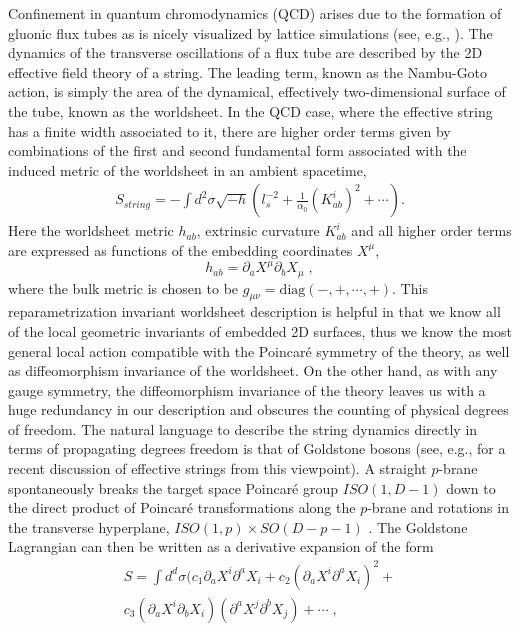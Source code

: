 \documentclass[%
 reprint,
 amsmath,amssymb,
 aps,
]{revtex4-1}
\begin{document}
Confinement in quantum chromodynamics (QCD) arises due to the formation of
gluonic flux tubes as is nicely visualized by lattice simulations (see, e.g., \cite{Bissey:2006bz}).
The dynamics of the transverse oscillations of a flux tube are
described by the 2D effective field theory of a string. The leading term, known as the
Nambu-Goto action, is simply the area of the dynamical, effectively two-dimensional surface
of the tube, known as the worldsheet. In the QCD case, where the effective string has a finite
width associated to it, there are higher order terms given by combinations of the first
and second fundamental form associated with the induced metric of the worldsheet in an
ambient spacetime,
\begin{eqnarray}
\label{diffaction}
    S_{string} = - \int d^2 \sigma \sqrt{- h} \left(
    l_s^{-2} + \frac{1}{\alpha_0} (K^i_{ab})^2 + \cdots \right).
\end{eqnarray}
Here the worldsheet metric $h_{ab}$, extrinsic curvature $K^i_{ab}$ and all higher order terms are expressed as functions of the embedding coordinates $X^\mu$,
\[
h_{ab}=\partial_a X^\mu\partial_bX_\mu\;,
\]
where the bulk metric is chosen to be $g_{\mu \nu} = \mathrm{diag}(-,+,\cdots,+)$.
This reparametrization invariant worldsheet description is helpful in that we know all
of the local geometric invariants of embedded 2D surfaces, thus we know the most general
local action compatible with the Poincar\'e symmetry of the theory, as
well as diffeomorphism invariance of the worldsheet. On the other hand, as with any gauge symmetry, the
diffeomorphism invariance of the theory leaves us with a huge redundancy in our description and obscures the counting of physical degrees of freedom.
 The natural language to describe the string dynamics directly in terms of propagating degrees freedom  is that of Goldstone bosons
 (see, e.g., \cite{Dubovsky:2012sh} for a recent discussion of effective strings from this viewpoint).
 A  straight $p$-brane spontaneously breaks the target space Poincar\'e group $ISO(1,D-1)$ down to the direct product of Poincar\'e
 transformations along the $p$-brane and rotations in the transverse hyperplane,
  $ISO(1,p)\times SO(D-p-1)$ . The Goldstone Lagrangian can then be written
as a derivative expansion of the form
\begin{eqnarray}
\label{action}
    S =  \int d^d \sigma (c_1 \partial_a X^i \partial^a X_i +
    c_2 (\partial_a X^i \partial^a X_i)^2 +  \\
    c_3 (\partial_a X^i \partial_b X_i)(\partial^a X^j \partial^b X_j) + \cdots \; , \nonumber
\end{eqnarray}
\end{document}
